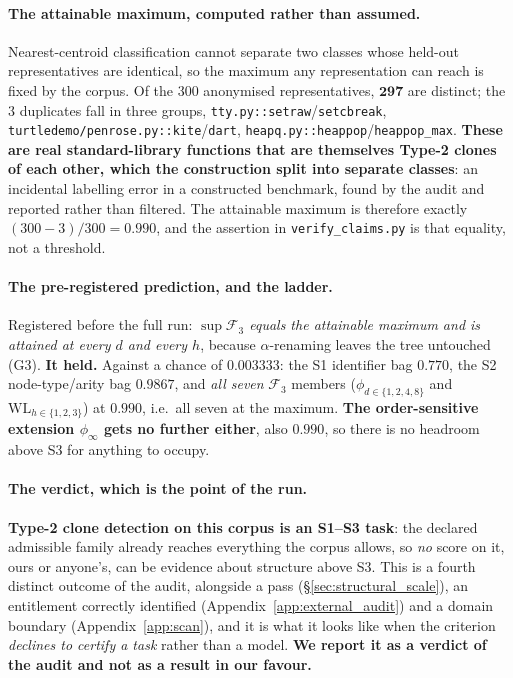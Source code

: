 \paragraph{The attainable maximum, computed rather than assumed.} Nearest-centroid classification cannot separate two classes whose held-out representatives are identical, so the maximum any representation can reach is fixed by the corpus. Of the $300$ anonymised representatives, $\mathbf{297}$ are distinct; the $3$ duplicates fall in three groups, \texttt{tty.py::setraw}/\texttt{setcbreak}, \texttt{turtledemo/penrose.py::kite}/\texttt{dart}, \texttt{heapq.py::heappop}/\texttt{heappop\_max}. \textbf{These are real standard-library functions that are themselves Type-2 clones of each other, which the construction split into separate classes}: an incidental labelling error in a constructed benchmark, found by the audit and reported rather than filtered. The attainable maximum is therefore exactly $(300-3)/300 = \mathbf{0.990}$, and the assertion in \texttt{verify\_claims.py} is that equality, not a threshold.

\paragraph{The pre-registered prediction, and the ladder.} Registered before the full run: \emph{$\sup\mathcal{F}_3$ equals the attainable maximum and is attained at every $d$ and every $h$}, because $\alpha$-renaming leaves the tree untouched (G3). \textbf{It held.} Against a chance of $0.003333$: the S1 identifier bag $0.770$, the S2 node-type/arity bag $0.9867$, and \emph{all seven} $\mathcal{F}_3$ members ($\phi_{d\in\{1,2,4,8\}}$ and $\mathrm{WL}_{h\in\{1,2,3\}}$) at $0.990$, i.e.\ all seven at the maximum. \textbf{The order-sensitive extension $\phi_\infty$ gets no further either}, also $0.990$, so there is no headroom above S3 for anything to occupy.

\paragraph{The verdict, which is the point of the run.} \textbf{Type-2 clone detection on this corpus is an S1--S3 task}: the declared admissible family already reaches everything the corpus allows, so \emph{no} score on it, ours or anyone's, can be evidence about structure above S3. This is a fourth distinct outcome of the audit, alongside a pass (\S\ref{sec:structural_scale}), an entitlement correctly identified (Appendix~\ref{app:external_audit}) and a domain boundary (Appendix~\ref{app:scan}), and it is what it looks like when the criterion \emph{declines to certify a task} rather than a model. \textbf{We report it as a verdict of the audit and not as a result in our favour.}

